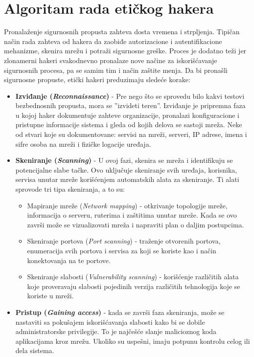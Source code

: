 \documentclass[a4paper]{article}
\begin{document}
{\section{Algoritam rada etičkog hakera}
\label{sec:algoritam}
Pronalaženje sigurnosnih propusta zahteva dosta vremena i strpljenja. Tipičan način rada zahteva od hakera da zaobiđe autorizacione i autentifikacione mehanizme, skenira mrežu i potraži sigurnosne greške. Proces je dodatno teži jer zlonamerni hakeri svakodnevno pronalaze nove načine za iskorišćavanje sigurnosnih procesa, pa se samim tim i način zaštite menja.
Da bi pronašli sigurnosne propuste, etički hakeri preduzimaju sledeće korake:
\begin{itemize}
\item \textbf{Izviđanje ({\em Reconnaissance})} - Pre nego što se sprovedu bilo kakvi testovi bezbednosnih propusta, mora se ''izvideti teren''. Izviđanje je pripremna faza u kojoj haker dokumentuje zahteve organizacije, pronalazi konfiguracione i pristupne informacije sistema i gleda od kojih delova se sastoji mreža. Neke od stvari koje su dokumentovane: servisi na mreži, serveri, IP adrese, imena i sifre osoba na mreži i fizičke logacije uređaja.
\item \textbf{Skeniranje ({\em Scanning})} - U ovoj fazi, skenira se mreža i identifikuju se potencijalne slabe tačke. Ovo uključuje skeniranje svih uređaja, korisnika, servisa unutar mreže korišćenjem automatskih alata za skeniranje. Ti alati sprovode tri tipa skeniranja, a to su:
\begin{itemize}
\item Mapiranje mreže  ({\em Network mapping})  - otkrivanje topologije mreže, informacija o serveru, ruterima i zaštitima unutar mreže. Kada se ovo završi može se vizualizovati mreža i napraviti plan o daljim postupcima.
\item Skeniranje portova  ({\em Port scanning}) - traženje otvorenih portova, enumeracija svih portova i servisa za koji se koriste kao i način konektovanja na te portove.
\item Skeniranje slabosti  ({\em Vulnerability scanning}) - korišćenje različitih alata koje proveravaju slabosti pojedinih verzija različitih tehnologija koje se koriste u mreži.
\end{itemize}
\item \textbf{Pristup ({\em Gaining access})} - kada se završi faza skeniranja, može se nastaviti sa pokušajem iskorišćavanja slabosti kako bi se dobile administratorske privilegije. To je najčešće slanje malicioznog koda aplikacijama kroz mrežu. Ukoliko su uspešni, imaju potpunu kontrolu celog ili dela sistema.

\end{itemize}}
\end{document}
